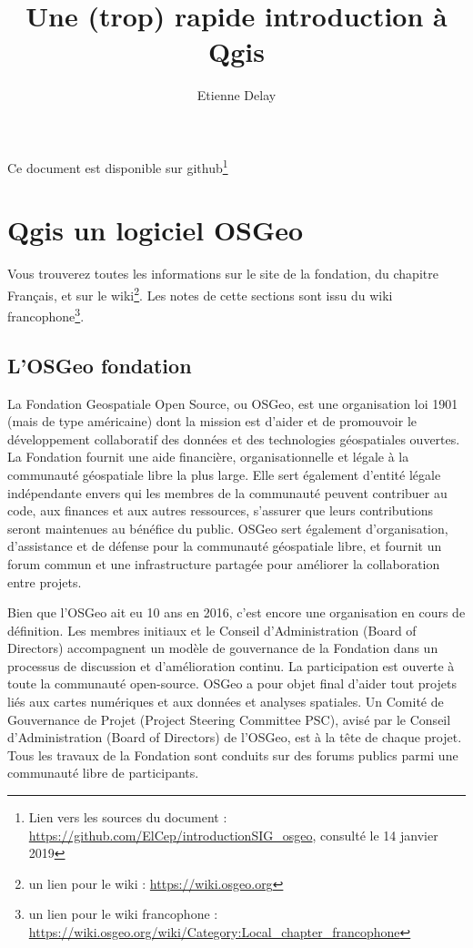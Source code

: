 \documentclass[a4paper, 11pt]{article}
\title{Une (trop) rapide introduction à Qgis}
\author[12]{Etienne Delay}
\affil[1]{CIRAD UMR SENS, F-34398 Montpellier, France}
\affil[2]{SENS, CIRAD, Université Cheick Anta Diop, Dakar}
\affil[3]{UMI UMMISCO, \'Ecole Polytechnique de Dakar, Université Cheick Anta Diop}
\begin{document}
\maketitle
Ce document est disponible sur github\footnote{Lien vers les sources du document : \url{https://github.com/ElCep/introductionSIG_osgeo}, consulté le 14 janvier 2019}

\section{Qgis un logiciel OSGeo}
Vous trouverez toutes les informations sur le site de la fondation, du chapitre Français, et sur le wiki\footnote{un lien pour le wiki : \url{https://wiki.osgeo.org}}. Les notes de cette sections sont issu du wiki francophone\footnote{un lien pour le wiki francophone : \url{https://wiki.osgeo.org/wiki/Category:Local\_chapter\_francophone}}.

  \subsection{L'OSGeo fondation}
  La Fondation Geospatiale Open Source, ou OSGeo, est une organisation loi 1901 (mais de type américaine) dont la mission est d'aider et de promouvoir le développement collaboratif des données et des technologies géospatiales ouvertes. La Fondation fournit une aide financière, organisationnelle et légale à la communauté géospatiale libre la plus large. Elle sert également d'entité légale indépendante envers qui les membres de la communauté peuvent contribuer au code, aux finances et aux autres ressources, s'assurer que leurs contributions seront maintenues au bénéfice du public. OSGeo sert également d'organisation, d'assistance et de défense pour la communauté géospatiale libre, et fournit un forum commun et une infrastructure partagée pour améliorer la collaboration entre projets.

  Bien que l'OSGeo ait eu 10 ans en 2016, c'est encore une organisation en cours de définition. Les membres initiaux et le Conseil d'Administration (Board of Directors) accompagnent un modèle de gouvernance de la Fondation dans  un processus de discussion et d'amélioration continu. La participation est ouverte à toute la communauté open-source. OSGeo a pour objet final d'aider tout projets liés aux cartes numériques et aux données et analyses spatiales. Un Comité de Gouvernance de Projet (Project Steering Committee PSC), avisé par le Conseil d'Administration (Board of Directors) de l'OSGeo, est à la tête de chaque projet. Tous les travaux de la Fondation sont conduits sur des forums publics parmi une communauté libre de participants.
\end{document}
